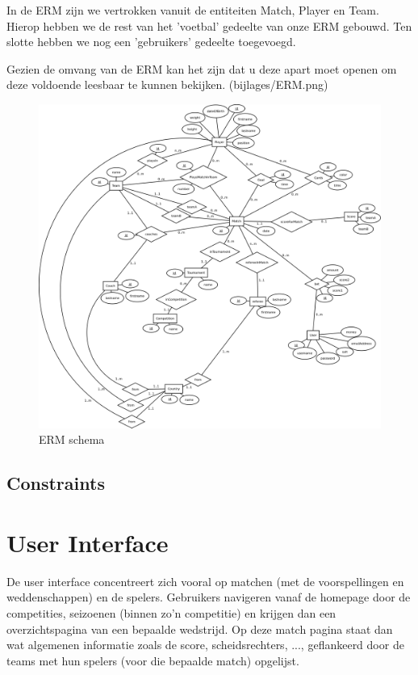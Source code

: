 \documentclass[11pt]{article}
\begin{document}
In de ERM zijn we vertrokken vanuit de entiteiten Match, Player en Team.  Hierop hebben we de rest van het 'voetbal' gedeelte van onze ERM gebouwd.  Ten slotte hebben we nog een 'gebruikers' gedeelte toegevoegd.

Gezien de omvang van de ERM kan het zijn dat u deze apart moet openen om deze voldoende leesbaar te kunnen bekijken.  (bijlages/ERM.png)


\begin{figure}[h!]
	\begin{center}
	\includegraphics[scale=0.11]{ERM.png}

	\caption{ERM schema}
	\label{fig:speler}
	\end{center}
\end{figure}



\subsection{Constraints}





\section{User Interface}


De user interface concentreert zich vooral op matchen (met de voorspellingen en weddenschappen) en de spelers.
Gebruikers navigeren vanaf de homepage door de competities, seizoenen (binnen zo'n competitie) en krijgen dan een overzichtspagina van een bepaalde wedstrijd.
Op deze match pagina staat dan wat algemenen informatie zoals de score, scheidsrechters, ..., geflankeerd door de teams met hun spelers (voor die bepaalde match) opgelijst.
\end{document}
